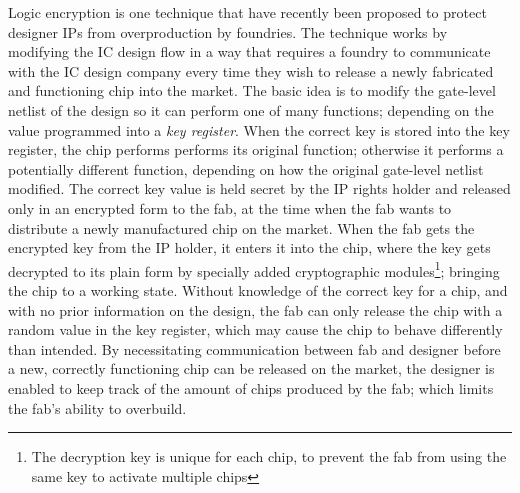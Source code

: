 Logic encryption is one technique that have recently been proposed to protect designer IPs from overproduction by foundries. The technique works by modifying the IC design flow in a way that requires a foundry to communicate with the IC design company every time they wish to release a newly fabricated and functioning chip into the market. The basic idea is to modify the gate-level netlist of the design so it 
can perform one of many functions; depending on the value programmed into a \emph{key register}. When the correct key is stored into the key register, the chip performs performs its original function; otherwise it performs a potentially different function, depending on how the original gate-level netlist modified. The correct key value is held secret by the IP rights holder and released only in an encrypted form to the fab, at the time when the fab wants to distribute a newly manufactured chip on the market. When the fab gets the encrypted key from the IP holder, it enters it into the chip, where the key gets decrypted to its plain form by specially added cryptographic modules\footnote{The decryption key is unique for each chip, to prevent the fab from using the same key to activate multiple chips}; bringing the chip to a working state.
Without knowledge of the correct key for a chip, and with no prior information on the design, the fab can only release the chip with a random value in the key register, which may cause the chip to behave differently than intended. By necessitating communication between fab and designer before a new, correctly functioning chip can be released on the market, the designer is enabled to keep track of the amount of chips produced by the fab; which limits the fab's ability to overbuild. 



